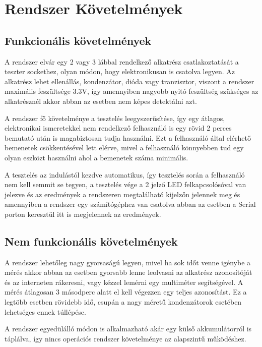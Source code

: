 \section{Rendszer Követelmények}

\subsection{Funkcionális követelmények}

A rendszer elvár egy 2 vagy 3 lábbal rendelkező alkatrész csatlakoztatását a 
teszter sockethez, olyan módon, hogy elektronikusan is csatolva legyen. 
Az alkatrész lehet ellenállás, kondenzátor, dióda vagy tranzisztor, viszont a 
rendszer maximális feszültsége 3.3V, így amennyiben nagyobb nyitó
feszültség szükséges az alkatrésznél akkor abban az esetben nem képes
detektálni azt.

A rendszer fő követelménye a tesztelés leegyszerűsítése, így egy átlagos,
elektronikai ismeretekkel nem rendelkező felhasználó is egy rövid 2 perces 
bemutató után is magabiztosan tudja használni. Ezt a felhasználó által elérhető
bemenetek csökkentésével lett elérve, mivel a felhasználó könnyebben 
tud egy olyan eszközt használni ahol a bemenetek száma minimális.

A tesztelés az indulástól kezdve automatikus, így tesztelés során a felhasználó
nem kell semmit se tegyen, a tesztelés vége a 2 jelző LED felkapcsolósóval van
jelezve és az eredmények a rendszeren megtalálható kijelzőn jelennek meg és 
amennyiben a rendszer egy számítógéphez van csatolva abban az esetben 
a Serial porton keresztül itt is megjelennek az eredmények.

\subsection{Nem funkcionális követelmények}

A rendszer lehetőleg nagy gyorsaságú legyen, mivel ha sok időt venne igénybe
a mérés akkor abban az esetben gyorsabb lenne leolvasni az alkatrész azonosítóját
és az interneten rákeresni, vagy kézzel lemérni egy multiméter segítségével.
A mérés átlagosan 3 másodperc alatt el kell végezzen egy teljes azonosítást. 
Ez a legtöbb esetben rövidebb idő, csupán
a nagy méretű kondenzátorok esetében lehetséges ennek túllépése.

A rendszer egyedülálló módon is alkalmazható akár egy külső 
akkumulátorról is táplálva, így nincs operációs rendszer követelménye
az alapszintű működéshez.

